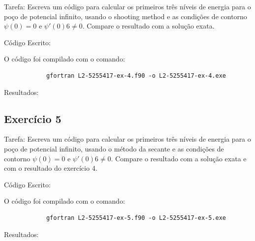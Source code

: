 \documentclass[12pt, a4paper]{article} %
\begin{document}
        Tarefa: Escreva um c\'odigo para calcular os primeiros tr\^es n\'iveis de energia para o po\c{c}o de potencial inﬁnito, usando o shooting method e as condi\c{c}\~oes de contorno $\psi(0) = 0$ e
        $\psi '(0) 6 \neq  0$. Compare o resultado com a solu\c{c}\~ao exata.

        C\'odigo Escrito:
        

        O c\'odigo foi compilado com o comando:
        \begin{verbatim}
            gfortran L2-5255417-ex-4.f90 -o L2-5255417-ex-4.exe
        \end{verbatim}

        Resultados:

    

    \subsection{Exerc\'icio 5}

        Tarefa: Escreva um c\'odigo para calcular os primeiros tr\^es n\'iveis de energia para o po\c{c}o de potencial inﬁnito, usando o m\'etodo da secante e as condi\c{c}\~oes de contorno $\psi(0) = 0$ e
        $\psi '(0) 6 \neq  0$. Compare o resultado com a solu\c{c}\~ao exata e com o resultado do exerc\'icio 4.

        C\'odigo Escrito:
        

        O c\'odigo foi compilado com o comando:
        \begin{verbatim}
            gfortran L2-5255417-ex-5.f90 -o L2-5255417-ex-5.exe
        \end{verbatim}

        Resultados:
        
\end{document}

